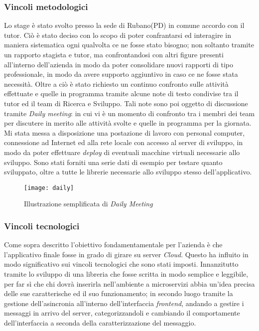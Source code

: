 \subsubsection{Vincoli metodologici}
Lo stage è stato svolto presso la sede di Rubano(PD) in comune accordo con il tutor. Ciò è stato deciso con lo scopo di poter confrantarsi ed interagire in maniera sistematica ogni qualvolta ce ne fosse stato bisogno; non soltanto tramite un rapporto stagista e tutor, ma confrontandosi con altri figure presenti all'interno dell'azienda in modo da poter consolidare nuovi rapporti di tipo professionale, in modo da avere supporto aggiuntivo in caso ce ne fosse stata necessità.
Oltre a ciò è stato richiesto un continuo confronto sulle attività effettuate e quelle in programma tramite alcune note di testo condivise tra il tutor ed il team di Ricerca e Sviluppo.
Tali note sono poi oggetto di discussione tramite \textit{Daily meeting}: in cui vi è un momento di confronto tra i membri dei team per discutere in merito alle attività svolte e quelle in programma per la giornata. Mi stata messa a disposizione una postazione di lavoro con personal computer, connessione ad Internet ed alla rete locale con accesso al server di sviluppo, in modo da poter effettuare \textit{\gls{deploy}} di eventuali macchine virtuali necessarie allo sviluppo. Sono stati forniti una serie dati di esempio per testare quanto sviluppato, oltre a tutte le librerie necessarie allo sviluppo stesso dell’applicativo.
\begin{figure}[!h] 
	\centering 
	\texttt{[image: daily]} 
	\caption{Illustrazione semplificata di \textit{Daily Meeting}}
\end{figure}
\subsubsection{Vincoli tecnologici}
Come sopra descritto l'obiettivo fondamentamentale per l'azienda è che l'applicativo finale fosse in grado di girare su server \textit{Cloud}. Questo ha influito in modo significativo sui vincoli tecnologici che sono stati imposti. Innanzitutto tramite lo sviluppo di una libreria che fosse scritta in modo semplice e leggibile, per far sì che chi dovrà inserirla nell'ambiente a microservizi abbia un'idea precisa delle sue caratterische ed il suo funzionamento; in secondo luogo tramite la gestione dell'asincronia all'interno dell'interfaccia \textit{frontend}, andando a gestire i messaggi in arrivo del server, categorizzandoli e cambiando il comportamente dell'interfaccia a seconda della caratterizzazione del messaggio.
